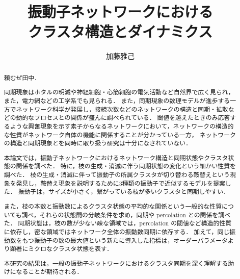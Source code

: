 \documentclass[system, bachelor]{systemB}%
\title{振動子ネットワークにおける\\クラスタ構造とダイナミクス}
\author{加藤雅己}
\theoremstyle{break}
\begin{document}
\maketitle%

\frontmatter%



\begin{abstract}%
  頼むぜ田中．
  
  同期現象はホタルの明滅や神経細胞・心筋細胞の電気活動など自然界で広く見られ，また，電力網などの工学系でも見られる．
  また，同期現象の数理モデルが進歩する一方でネットワーク科学が発展し，接続次数などのネットワークの構造と同期・拡散などの動的なプロセスとの関係が盛んに調べられている．  
  閾値を越えたときのみ応答するような興奮現象を示す素子からなるネットワークにおいて，ネットワークの構造的な性質がネットワーク自体の機能に関係することが分かっている一方，
  ネットワークの構造と同期現象とを同時に取り扱う研究は十分になされていない．
  
  本論文では，振動子ネットワークにおけるネットワーク構造と同期状態やクラスタ状態の関係を調べた．
  特に，枝の生成・消滅に伴う同期状態の変化という細かい性質を調べた．
  枝の生成・消滅に伴って振動子の所属クラスタが切り替わる鞍替えという現象を発見し，鞍替え現象を説明するために3種類の振動子で近似するモデルを提案した．
  振動子は，サイズが小さく，繋がっている枝が多いクラスタと同期しやすい．
  
  また，枝の本数と振動数によるクラスタ状態の平均的な関係という一般的な性質についても調べ，それらの状態間の分岐条件を求め，同期や percolation との関係を調べた．
  同期状態は，枝の数が少ない疎な領域では，percolation の閾値など構造的性質に依存し，密な領域ではネットワーク全体の振動数同期に依存する．
  加えて，同じ振動数をもつ振動子の数の最大値という新たに導入した指標は，オーダーパラメータより顕著にミクロなクラスタ状態を表す．
  
  本研究の結果は，一般の振動子ネットワークにおけるクラスタ同期を深く理解する助けになることが期待される．
\end{abstract}


{\makeatletter
\let\ps@jpl@in\ps@empty
\makeatother
\pagestyle{empty}
\tableofcontents
\clearpage}
\end{document}
